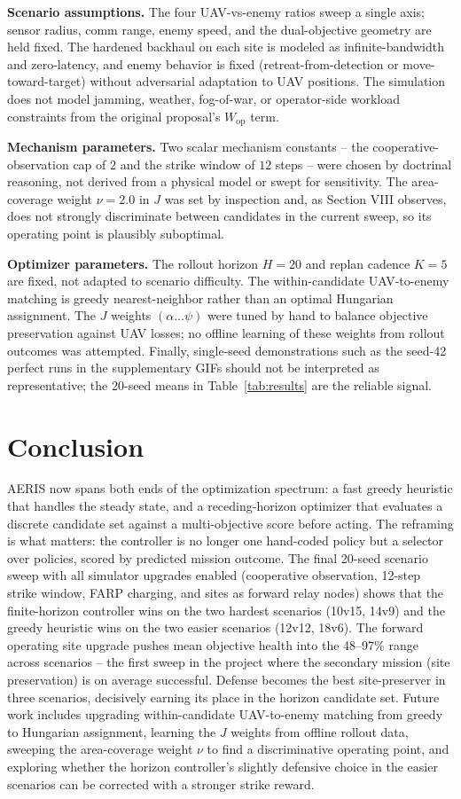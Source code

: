 \documentclass[conference]{IEEEtran}
\begin{document}
\textbf{Scenario assumptions.} The four UAV-vs-enemy ratios sweep a single
axis; sensor radius, comm range, enemy speed, and the dual-objective
geometry are held fixed. The hardened backhaul on each site is modeled as
infinite-bandwidth and zero-latency, and enemy behavior is fixed
(retreat-from-detection or move-toward-target) without adversarial
adaptation to UAV positions. The simulation does not model jamming,
weather, fog-of-war, or operator-side workload constraints from the
original proposal's $W_{\text{op}}$ term.

\textbf{Mechanism parameters.} Two scalar mechanism constants -- the
cooperative-observation cap of $2$ and the strike window of $12$ steps --
were chosen by doctrinal reasoning, not derived from a physical model or
swept for sensitivity. The area-coverage weight $\nu=2.0$ in $J$ was set
by inspection and, as Section VIII observes, does not strongly
discriminate between candidates in the current sweep, so its operating
point is plausibly suboptimal.

\textbf{Optimizer parameters.} The rollout horizon $H=20$ and replan
cadence $K=5$ are fixed, not adapted to scenario difficulty. The
within-candidate UAV-to-enemy matching is greedy nearest-neighbor rather
than an optimal Hungarian assignment. The $J$ weights $(\alpha\ldots\psi)$
were tuned by hand to balance objective preservation against UAV losses;
no offline learning of these weights from rollout outcomes was attempted.
Finally, single-seed demonstrations such as the seed-42 perfect runs in
the supplementary GIFs should not be interpreted as representative; the
20-seed means in Table~\ref{tab:results} are the reliable signal.

\section{Conclusion}
AERIS now spans both ends of the optimization spectrum: a fast greedy
heuristic that handles the steady state, and a receding-horizon optimizer that
evaluates a discrete candidate set against a multi-objective score before
acting. The reframing is what matters: the controller is no longer one
hand-coded policy but a selector over policies, scored by predicted mission
outcome. The final 20-seed scenario sweep with all simulator upgrades enabled
(cooperative observation, 12-step strike window, FARP charging, and
sites as forward relay nodes) shows that the finite-horizon controller
wins on the two hardest scenarios (10v15, 14v9) and the greedy heuristic
wins on the two easier scenarios (12v12, 18v6). The forward operating
site upgrade pushes mean objective health into the 48--97\% range across
scenarios -- the first sweep in the project where the secondary mission
(site preservation) is on average successful. Defense becomes the
best site-preserver in three scenarios, decisively earning its place in
the horizon candidate set. Future work includes upgrading within-candidate
UAV-to-enemy matching from greedy to Hungarian assignment, learning the
$J$ weights from offline rollout data, sweeping the area-coverage weight
$\nu$ to find a discriminative operating point, and exploring whether the
horizon controller's slightly defensive choice in the easier scenarios
can be corrected with a stronger strike reward.
\end{document}
